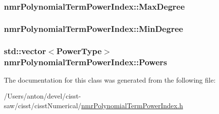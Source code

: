 \subsubsection[{Max\+Degree}]{ nmr\+Polynomial\+Term\+Power\+Index\+::\+Max\+Degree\hspace{0.3cm}{\ttfamily [protected]}}\label{classnmr_polynomial_term_power_index_a9b831b9f652cd6053941aff903ddb024}
\hypertarget{classnmr_polynomial_term_power_index_a16ac64643c0802d0efb4bf3f617d0964}{}
\subsubsection[{Min\+Degree}]{ nmr\+Polynomial\+Term\+Power\+Index\+::\+Min\+Degree\hspace{0.3cm}{\ttfamily [protected]}}\label{classnmr_polynomial_term_power_index_a16ac64643c0802d0efb4bf3f617d0964}
\hypertarget{classnmr_polynomial_term_power_index_a05f4d771e733168086d285e1cf0e1d1e}{}
\subsubsection[{Powers}]{\setlength{\rightskip}{0pt plus 5cm}std\+::vector$<${\bf Power\+Type}$>$ nmr\+Polynomial\+Term\+Power\+Index\+::\+Powers\hspace{0.3cm}{\ttfamily [protected]}}\label{classnmr_polynomial_term_power_index_a05f4d771e733168086d285e1cf0e1d1e}


The documentation for this class was generated from the following file\+:\begin{DoxyCompactItemize}
\item 
/\+Users/anton/devel/cisst-\/saw/cisst/cisst\+Numerical/\hyperlink{nmr_polynomial_term_power_index_8h}{nmr\+Polynomial\+Term\+Power\+Index.\+h}\end{DoxyCompactItemize}
